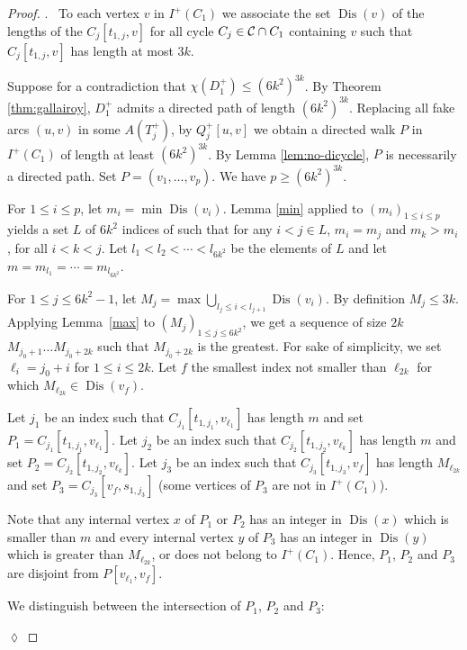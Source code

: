 \documentclass[utf8,10pt]{article}
\theoremstyle{plain}
\theoremstyle{definition}
\theoremstyle{remark}
\newenvironment{subproof}{\par\noindent {\it Subproof}.\ }{\hfill$\lozenge$\par\vspace{11pt}}
\newcommand{\col}{(6k^2)^{3k}}
\DeclareMathOperator{\Dis}{Dis}
\begin{document}
\begin{proof}
\begin{subproof}
To each vertex $v$ in $I^+(C_1)$ we associate the set $\Dis(v)$ of the lengths of the $C_j[t_{1,j},v]$ for all cycle $C_j\in {\cal C} \cap C_1$ containing $v$ such that $C_j[t_{1,j},v]$ has length at most $3k$.


Suppose for a contradiction that $\chi(D^+_1) \leq  \col$.
By Theorem \ref{thm:gallairoy}, $D^+_1$ admits a directed path of length $\col$. Replacing all fake arcs  $(u,v)$ in some $A(T^+_j)$, by 
$Q^+_j[u,v]$ we obtain a directed walk $P$ in $I^+(C_1)$ of length at least $\col$. By Lemma \ref{lem:no-dicycle}, $P$ is necessarily a directed path. Set $P=(v_1,  \dots , v_{p})$. We have $p\geq \col$.

For $1\leq i\leq p$, let $m_i = \min \Dis(v_i)$. 
Lemma \ref{min} applied to $(m_i)_{1\leq i\leq p}$ yields a set $L$ of $6k^2$ indices of such that 
for any $i< j \in L$,  $m_i=m_j$ and $m_k > m_i$, for all $i< k < j$.
Let $l_1 < l_2 < \cdots < l_{6k^2}$ be the elements of $L$ and let $m= m_{l_1} = \cdots = m_{l_{6k^2}}$.


For $1\leq j\leq 6k^2-1$, let $M_j = \max \bigcup_{l_j\leq i < l_{j+1}} \Dis(v_i)$.
By definition $M_j\leq 3k$.
Applying Lemma~\ref{max} to $(M_j)_{1\leq j\leq 6k^2}$,  we get a sequence of size $2k$ $M_{j_0+1} \dots M_{j_0+{2k}}$ such that $M_{j_0+{2k}}$ is the greatest. For sake of simplicity, we set $\ell_i =j_0+i$ for $1\leq i\leq 2k$.
Let $f$ the smallest index not smaller than $\ell_{2k}$ for which $M_{\ell_{2k}} \in \Dis (v_f)$. 

Let $j_1$ be an index such that $C_{j_1}[t_{1,j_1},v_{\ell_1}]$ has length $m$ and set $P_1=C_{j_1}[t_{1,j_1},v_{\ell_1}]$.
Let $j_2$ be an index such that $C_{j_2}[t_{1,j_2},v_{\ell_k}]$ has length $m$ and set $P_2=C_{j_2}[t_{1,j_2},v_{\ell_k}]$.
Let $j_3$ be an index such that  $C_{j_3}[t_{1,j_3},v_{f}]$ has length $M_{\ell_{2k}}$ and set $P_3=C_{j_3}[v_f, s_{1,j_3}]$ (some vertices of $P_3$ are not in $I^+(C_1)$).

Note that any internal vertex $x$ of $P_1$ or $P_2$ has an integer in $\Dis(x)$
which is smaller than $m$ and every internal vertex $y$ of $P_3$ has an integer in $\Dis(y)$ which
is greater than $M_{\ell_{2k}}$, or does not belong to $I^+(C_1)$. Hence, 
$P_1$, $P_2$ and $P_3$ are disjoint from $P[v_{\ell_1},v_f]$. 


We distinguish between the intersection of $P_1$, $P_2$ and $P_3$:


\end{subproof}
\end{proof}
\end{document}
